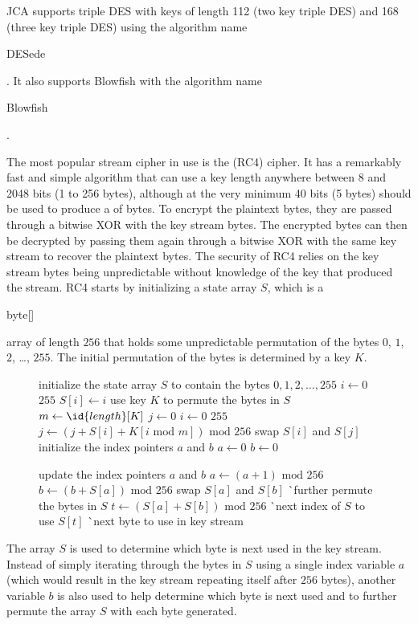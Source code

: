 JCA supports triple DES with keys of length 112 (two key triple DES) and
168 (three key triple DES) using the algorithm name \begin{code}DESede\end{code}.
It also supports Blowfish with the algorithm name \begin{code}Blowfish\end{code}.

The most popular stream cipher in use is the  (RC4) cipher.
It has a remarkably fast and simple algorithm that can use a key length anywhere
between 8 and 2048 bits (1 to 256 bytes), although at the very minimum 40 bits
(5 bytes) should be used to produce a  of bytes.
To encrypt the plaintext bytes, they are passed through a bitwise XOR with
the key stream bytes.
The encrypted bytes can then be decrypted by passing them again through a bitwise XOR
with the same key stream to recover the plaintext bytes.
The security of RC4 relies on the key stream bytes being unpredictable without
knowledge of the key that produced the stream.
RC4 starts by initializing a state array $S$, which is a \begin{code}byte[]\end{code}
array of length $256$ that holds some unpredictable permutation of the bytes
$0$, $1$, $2$, \dots, $255$. The initial permutation of the bytes is determined
by a key $K$.
\begin{figure*}[htb]
\begin{codebox}
\li \Comment initialize the state array $S$ to contain the bytes $0,1,2,\dots,255$
\li \For $i \gets 0$ \To $255$ \Do
\li    $S[i] \gets i$
    \End
\li \Comment use key $K$ to permute the bytes in $S$
\li $m \gets \id{length}[K]$
\li $j \gets 0$
\li \For $i \gets 0$ \To $255$ \Do
\li    $j \gets (j + S[i] + K[i \mbox{ mod } m]) \mbox{ mod } 256$
\li    swap $S[i]$ and $S[j]$
    \End
\li \Comment initialize the index pointers $a$ and $b$
\li $a \gets 0$
\li $b \gets 0$
\end{codebox}

\begin{codebox}
\li \Comment update the index pointers $a$ and $b$
\li $a \gets (a+1) \mbox{ mod } 256$
\li $b \gets (b+S[a]) \mbox{ mod } 256$
\li swap $S[a]$ and $S[b]$ \`\Comment further permute the bytes in $S$
\li $t \gets (S[a] + S[b]) \mbox{ mod } 256$ \`\Comment next index of $S$ to use
\li \Return $S[t]$ \`\Comment next byte to use in key stream
\end{codebox}
\end{figure*}
The array $S$ is used to determine which byte is next used in
the key stream. Instead of simply iterating through the bytes in $S$
using a single index variable $a$
(which would result in the key stream repeating itself after $256$ bytes),
another variable $b$ is also used to help determine which byte is next used
and to further permute the array $S$ with each byte generated.

